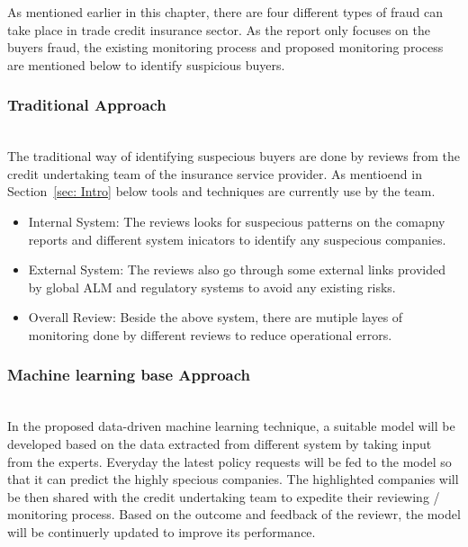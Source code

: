 As mentioned earlier in this chapter, there are four different types of fraud can take place in trade credit insurance sector. As the report only focuses on the buyers fraud, the existing monitoring process and proposed monitoring process are mentioned below to identify suspicious buyers.
\subsubsection{Traditional Approach}\hspace*{\fill} \\

The traditional way of identifying suspecious buyers are done by reviews from the credit undertaking team of the insurance service provider. As mentioend in Section~\ref{sec: Intro} below tools and techniques are currently use by the team.
\begin{itemize}
    \item{Internal System:} The reviews looks for suspecious patterns on the comapny reports and different system inicators to identify any suspecious companies.
    \item{External System:} The reviews also go through some external links provided by global ALM and regulatory systems to avoid any existing risks.
    \item{Overall Review:} Beside the above system, there are mutiple layes of monitoring done by different reviews to reduce operational errors.
\end{itemize}

\subsubsection{Machine learning base Approach}\hspace*{\fill} \\

In the proposed data-driven machine learning technique, a suitable model will be developed based on the data extracted from different system by taking input from the experts. Everyday the latest policy requests will be fed to the model so that it can predict the highly specious companies. The highlighted companies will be then shared with the credit undertaking team to expedite their reviewing / monitoring process. Based on the outcome and feedback of the reviewr, the model will be continuerly updated to improve its performance.



